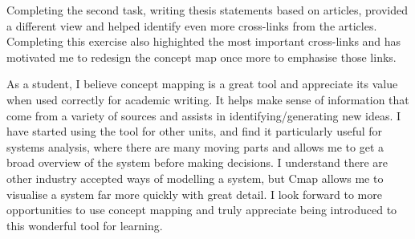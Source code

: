 \documentclass[a4paper, 12pt]{article}
\begin{document}
Completing the second task, writing thesis statements based on articles, provided a different view and helped identify even more cross-links from the articles. Completing this exercise also highighted the most important cross-links and has motivated me to redesign the concept map once more to emphasise those links.

As a student, I believe concept mapping is a great tool and appreciate its value when used correctly for academic writing. It helps make sense of information that come from a variety of sources and assists in identifying/generating new ideas. I have started using the tool for other units, and find it particularly useful for systems analysis, where there are many moving parts and allows me to get a broad overview of the system before making decisions. I understand there are other industry accepted ways of modelling a system, but Cmap allows me to visualise a system far more quickly with great detail. I look forward to more opportunities to use concept mapping and truly appreciate being introduced to this wonderful tool for learning.




\printbibliography
\end{document}
